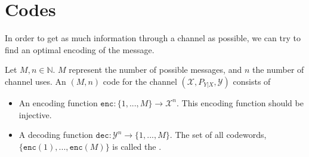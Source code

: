 \section{Codes}
In order to get as much information through a channel as possible, we can try to find an optimal encoding of the message.

\begin{definition}[Code]
Let $M, n \in \mathbb{N}$. $M$ represent the number of possible messages, and $n$ the number of channel uses. An $(M,n)$ code for the channel $(\mathcal{X},P_{Y|X},\mathcal{Y})$ consists of
\begin{itemize}
\item An encoding function $\mathtt{enc} : \{1, ..., M\} \to \mathcal{X}^n$. This encoding function should be injective.
\item A decoding function $\mathtt{dec} : \mathcal{Y}^n \to \{1, ..., M\}$.
The set of all codewords, $\{\mathtt{enc}(1), ..., \mathtt{enc}(M)\}$ is called the .
\end{itemize}
\end{definition}